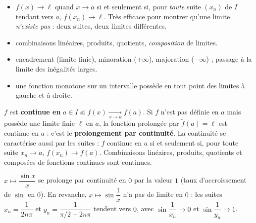 \begin{theoreme}
\begin{itemize}[label={\color{otNavy}\textbullet},leftmargin=1.4em,itemsep=0.6mm,topsep=0.8mm]
  \item {} $f(x)\to\ell$ quand $x\to a$ si et seulement
    si, pour \emph{toute} suite $(x_n)$ de $I$ tendant vers $a$,
    $f(x_n)\to\ell$. Très efficace pour montrer qu'une limite
    \emph{n'existe pas} : deux suites, deux limites différentes.
  \item {} combinaisons linéaires, produits, quotients,
    \emph{composition} de limites.
  \item {} encadrement (limite finie), minoration
    ($+\infty$), majoration ($-\infty$) ; passage à la limite des
    inégalités larges.
  \item {} une fonction monotone sur un intervalle
    possède en tout point des limites à gauche et à droite.
\end{itemize}
\end{theoreme}


\begin{definition}
$f$ est \textbf{continue en} $a\in I$ si $f(x)\xrightarrow[x\to a]{}f(a)$.
Si $f$ n'est pas définie en $a$ mais possède une limite finie $\ell$ en $a$,
la fonction prolongée par $\widetilde{f}(a)=\ell$ est continue en $a$ : c'est
le \textbf{prolongement par continuité}. La continuité se caractérise aussi
par les suites : $f$ continue en $a$ si et seulement si, pour toute suite
$x_n\to a$, $f(x_n)\to f(a)$. Combinaisons linéaires, produits, quotients et
composées de fonctions continues sont continues.
\end{definition}

\begin{exemple}
$x\mapsto\dfrac{\sin x}{x}$ se prolonge par continuité en $0$ par la valeur
$1$ (taux d'accroissement de $\sin$ en $0$). En revanche,
$x\mapsto\sin\dfrac1x$ n'a pas de limite en $0$ : les suites
$x_n=\dfrac{1}{2n\pi}$ et $y_n=\dfrac{1}{\pi/2+2n\pi}$ tendent vers $0$,
avec $\sin\dfrac{1}{x_n}\to0$ et $\sin\dfrac{1}{y_n}\to1$.
\end{exemple}


